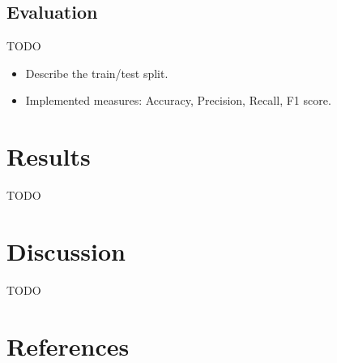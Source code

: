 \documentclass[11pt,a4paper]{article}
\begin{document}
\subsection{Evaluation}

TODO
\begin{itemize}
    \item Describe the train/test split.
    \item Implemented measures: Accuracy, Precision, Recall, F1 score.
\end{itemize}



\section{Results}

TODO



\section{Discussion}

TODO



\section{References}



\end{document}
